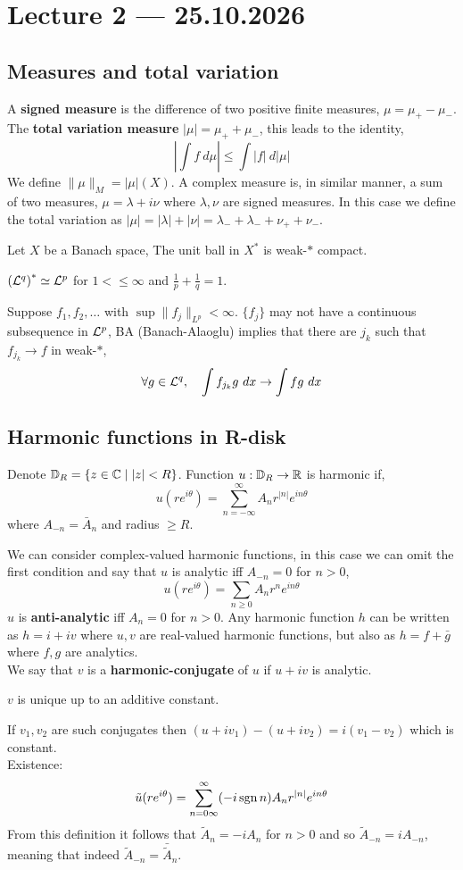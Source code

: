 \section{Lecture 2 --- 25.10.2026}
\subsection{Measures and total variation}
A \textbf{signed measure} is the difference of two positive finite measures, $\mu = \mu_+ - \mu_-$.
The \textbf{total variation measure} $|\mu| = \mu_+ + \mu_-$, this leads to the identity,
\[
	\left\lvert \int f\ d \mu \right\rvert
	\le \int |f|\ d |\mu|
\]
We define $\lVert \mu \rVert_M = |\mu|(X)$.
A complex measure is, in similar manner, a sum of two measures, $\mu = \lambda + i \nu$ where $\lambda, \nu$ are signed measures.
In this case we define the total variation as $|\mu| = |\lambda| + |\nu| = \lambda_- + \lambda_- + \nu_+ + \nu_-$.
\begin{theorem}
	Let $X$ be a Banach space, The unit ball in $X^*$ is weak-$*$ compact.
\end{theorem}
\begin{example}
	${(\mathcal{L}^q)}^* \simeq \mathcal{L}^p$ for $1 < \le \infty$ and $\frac{1}{p} + \frac{1}{q} = 1$.
\end{example}
Suppose $f_1, f_2, \ldots$ with $\sup \lVert f_j \rVert_{L^p} < \infty$.
$\{ f_j \}$ may not have a continuous subsequence in $\mathcal{L}^p$, BA (Banach-Alaoglu) implies that there are $j_k$ such that $f_{j_k} \to f$ in weak-$*$,
\[
	\forall g \in \mathcal{L}^q,
	\quad
	\int f_{j_k} g\ d x
	\to \int f g\ d x
\]

\subsection{Harmonic functions in R-disk}
Denote $\mathbb{D}_R = \{ z \in \mathbb{C} \mid |z| < R \}$.
Function $u : \mathbb{D}_R \to \mathbb{R}$ is harmonic if,
\[
	u(r e^{i \theta})
	= \sum_{n = -\infty}^\infty A_n r^{|n|} e^{i n \theta}
\]
where $A_{-n} = \bar{A}_n$ and radius $\ge R$.

We can consider complex-valued harmonic functions, in this case we can omit the first condition and say that $u$ is analytic iff $A_{-n} = 0$ for $n > 0$,
\[
	u(r e^{i \theta})
	= \sum_{n \ge 0} A_n r^n e^{i n \theta}
\]
$u$ is \textbf{anti-analytic} iff $A_n = 0$ for $n > 0$.
Any harmonic function $h$ can be written as $h = i + i v$ where $u, v$ are real-valued harmonic functions, but also as $h = f + \bar{g}$ where $f, g$ are analytics. \\
We say that $v$ is a \textbf{harmonic-conjugate} of $u$ if $u + i v$ is analytic.
\begin{lemma}
	$v$ is unique up to an additive constant.
\end{lemma}
If $v_1, v_2$ are such conjugates then $(u + i v_1) - (u + i v_2) = i(v_1 - v_2)$ which is constant. \\
Existence:
\[
	\tilde{u}(r e^{i \theta})
	= \sum_{n = 0\infty}^\infty (-i \operatorname{sgn} n) A_n r^{|n|} e^{i n \theta}
\]
From this definition it follows that $\tilde{A}_n = -i A_n$ for $n > 0$ and so $\tilde{A}_{-n} = i A_{-n}$, meaning that indeed $\tilde{A}_{-n} = \bar{\tilde{A}}_n$.

